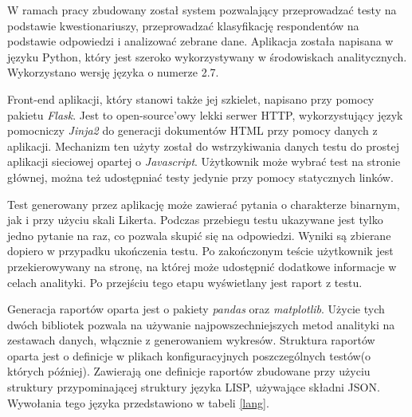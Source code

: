 \documentclass[12pt,a4paper,oneside]{report} %
\begin{document}
W ramach pracy zbudowany został system pozwalający przeprowadzać testy na podstawie kwestionariuszy, przeprowadzać klasyfikację respondentów na podstawie odpowiedzi i analizować zebrane dane. Aplikacja została napisana w języku Python, który jest szeroko wykorzystywany w środowiskach analitycznych. Wykorzystano wersję języka o numerze 2.7.\par

Front-end aplikacji, który stanowi także jej szkielet, napisano przy pomocy pakietu \emph{Flask}. Jest to open-source'owy lekki serwer HTTP, wykorzystujący język pomocniczy \emph{Jinja2} do generacji dokumentów HTML przy pomocy danych z aplikacji. Mechanizm ten użyty został do wstrzykiwania danych testu do prostej aplikacji sieciowej opartej o \emph{Javascript}. Użytkownik może wybrać test na stronie głównej, można też udostępniać testy jedynie przy pomocy statycznych linków.\par

Test generowany przez aplikację może zawierać pytania o charakterze binarnym, jak i przy użyciu skali Likerta. Podczas przebiegu testu ukazywane jest tylko jedno pytanie na raz, co pozwala skupić się na odpowiedzi. Wyniki są zbierane dopiero w przypadku ukończenia testu. Po zakończonym teście użytkownik jest przekierowywany na stronę, na której może udostępnić dodatkowe informacje w celach analityki. Po przejściu tego etapu wyświetlany jest raport z testu.\par

Generacja raportów oparta jest o pakiety \emph{pandas} oraz \emph{matplotlib}. Użycie tych dwóch bibliotek pozwala na używanie najpowszechniejszych metod analityki na zestawach danych, włącznie z generowaniem wykresów. Struktura raportów oparta jest o definicje w plikach konfiguracyjnych poszczególnych testów(o których później). Zawierają one definicje raportów zbudowane przy użyciu struktury przypominającej struktury języka LISP, używające składni JSON. Wywołania tego języka przedstawiono w tabeli \ref{lang}.\par
\end{document}
